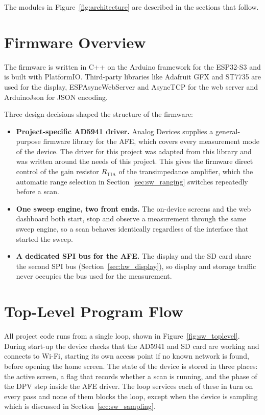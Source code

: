 The modules in Figure~\ref{fig:architecture} are described in the sections that follow.

\section{Firmware Overview}
\label{sec:sw_overview}

The firmware is written in C++ on the Arduino framework for the ESP32-S3 and
is built with PlatformIO. Third-party libraries like Adafruit GFX and ST7735 are used for the display, ESPAsyncWebServer and AsyncTCP for
the web server and ArduinoJson for JSON encoding.

Three design decisions shaped the structure of the firmware:
\begin{itemize}[label=\textbullet]
  \item \textbf{Project-specific AD5941 driver.} Analog Devices
    supplies a general-purpose firmware library for the AFE, which covers every measurement mode of the device. The driver for this project was adapted from this library and was written around the needs of this project. This gives
    the firmware direct control of the gain resistor $R_\text{TIA}$ of the
    transimpedance amplifier, which the automatic range selection in
    Section~\ref{sec:sw_ranging} switches repeatedly before a scan.

  \item \textbf{One sweep engine, two front ends.} The on-device screens and
    the web dashboard both start, stop and observe a measurement through the
    same sweep engine, so a scan behaves identically regardless of the interface that started the sweep.
  \item \textbf{A dedicated SPI bus for the AFE.} The display and the SD card
    share the second SPI bus (Section~\ref{sec:hw_display}), so
    display and storage traffic never occupies the bus used for the
    measurement.
\end{itemize}

\section{Top-Level Program Flow}  
\label{sec:sw_toplevel}

All project code runs from a single loop, shown in
Figure~\ref{fig:sw_toplevel}. During start-up the device checks that the AD5941 and SD card are working and connects to Wi-Fi, starting its own access point if no known network is found, before opening the home screen. The state of the device is stored in three places: the active screen, a flag that records whether a scan is running, and the phase of the DPV step inside the AFE driver. The loop services each of these in turn on
every pass and none of them blocks the loop, except when the device is sampling which is discussed in Section~\ref{sec:sw_sampling}.

